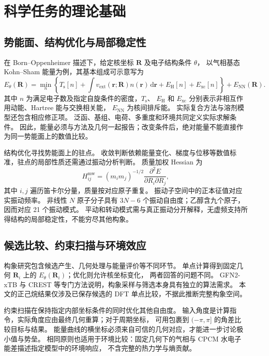 \documentclass[UTF8,fontset=fandol,a4paper,11pt]{ctexart}
\begin{document}
\section{科学任务的理论基础}
\subsection{势能面、结构优化与局部稳定性}
在 Born--Oppenheimer 描述下，给定核坐标 $\mathbf R$ 及电子结构条件 $\theta$，%
以气相基态 Kohn--Sham 能量为例，其基本组成可示意写为
\begin{equation}
  E_{\theta}(\mathbf R)=\min_{n}\!\left\{T_{\mathrm s}[n]
  +\int v_{\mathrm{ext}}(\mathbf r;\mathbf R)n(\mathbf r)\,\mathrm d\mathbf r
  +E_{\mathrm H}[n]+E_{\mathrm{xc}}[n]\right\}
  +E_{\mathrm{NN}}(\mathbf R).
\end{equation}
其中 $n$ 为满足电子数及指定自旋条件的密度，$T_{\mathrm s}$、%
$E_{\mathrm H}$ 和 $E_{\mathrm{xc}}$ 分别表示非相互作用动能、Hartree 能与交换相关能，%
$E_{\mathrm{NN}}$ 为核间排斥能\cite{hk,ks}。%
实际复合方法与溶剂模型还包含相应修正项。%
泛函、基组、电荷、多重度和环境共同定义实际求解条件。%
因此，能量必须与方法及几何一起报告；改变条件后，绝对能量不能直接作为同一势能面上的数值比较。

结构优化寻找势能面上的驻点。%
收敛判断依赖能量变化、梯度与位移等数值标准，驻点的局部性质还需通过振动分析判断。%
质量加权 Hessian 为
\begin{equation}
  H^{\mathrm{mw}}_{ij}=(m_i m_j)^{-1/2}
  \frac{\partial^2 E}{\partial R_i\partial R_j},
\end{equation}
其中 $i,j$ 遍历笛卡尔分量，质量按对应原子重复。%
振动子空间中的正本征值对应实振动频率。%
非线性 $N$ 原子分子具有 $3N-6$ 个振动自由度；乙醇含九个原子，因而对应 21 个振动模式。%
平动和转动模式需与真正振动分开解释，无虚频支持所得结构的局部稳定性，不能穷尽其他构象。

\subsection{候选比较、约束扫描与环境效应}
构象研究包含候选产生、几何处理与能量评价等不同环节。%
单点计算得到固定几何 $\mathbf R_i$ 上的 $E_{\theta}(\mathbf R_i)$；优化则允许核坐标变化，%
两者回答的问题不同。%
GFN2-xTB 与 CREST 等专门方法说明，构象采样与筛选本身具有独立的算法需求\cite{gfn2,crest}。%
本文的正己烷结果仅涉及已保存候选的 DFT 单点比较，不据此推断完整构象空间。

约束扫描在保持指定内部坐标条件的同时优化其他自由度。%
输入角度是计算指令，实际角度应由最终几何重算；对于周期坐标，%
可用包裹到 $(-\pi,\pi]$ 的角差比较目标与结果。%
能量曲线的横坐标必须来自可信的几何对应，才能进一步讨论极小值与势垒。%
相同原则也适用于环境比较：固定几何下的气相与 CPCM 水电子能差描述指定模型中的环境响应，%
不含完整的热力学与熵贡献\cite{cpcm}。
\end{document}
